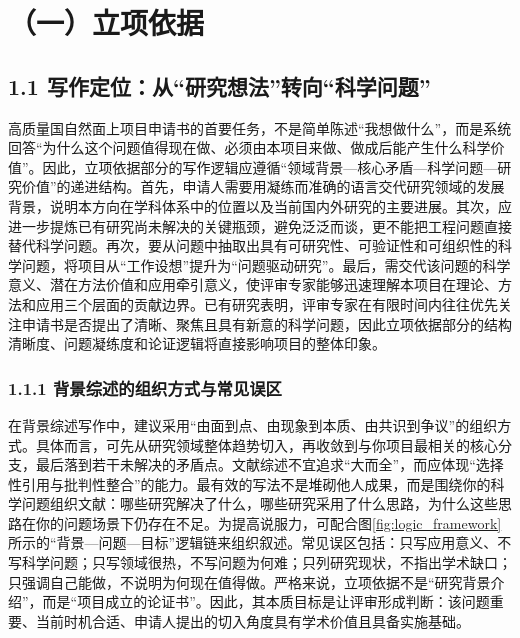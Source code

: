 \documentclass[12pt,UTF8,AutoFakeBold=2,a4paper]{ctexart}
\begin{document}
	\NSFCReportTitle
	\NSFCIntro

	\section{（一）立项依据}
	\NSFCGuideText{\NSFCSectionOneGuide}
	
	\subsection{1.1 写作定位：从“研究想法”转向“科学问题”}
	
	高质量国自然面上项目申请书的首要任务，不是简单陈述“我想做什么”，而是系统回答“为什么这个问题值得现在做、必须由本项目来做、做成后能产生什么科学价值”。因此，立项依据部分的写作逻辑应遵循“领域背景—核心矛盾—科学问题—研究价值”的递进结构。首先，申请人需要用凝练而准确的语言交代研究领域的发展背景，说明本方向在学科体系中的位置以及当前国内外研究的主要进展。其次，应进一步提炼已有研究尚未解决的关键瓶颈，避免泛泛而谈，更不能把工程问题直接替代科学问题。再次，要从问题中抽取出具有可研究性、可验证性和可组织性的科学问题，将项目从“工作设想”提升为“问题驱动研究”。最后，需交代该问题的科学意义、潜在方法价值和应用牵引意义，使评审专家能够迅速理解本项目在理论、方法和应用三个层面的贡献边界。已有研究表明，评审专家在有限时间内往往优先关注申请书是否提出了清晰、聚焦且具有新意的科学问题，因此立项依据部分的结构清晰度、问题凝练度和论证逻辑将直接影响项目的整体印象\cite{Herbert2013,Barnett2015,Fang2016}。
	
	\subsubsection{1.1.1 背景综述的组织方式与常见误区}
	
	在背景综述写作中，建议采用“由面到点、由现象到本质、由共识到争议”的组织方式。具体而言，可先从研究领域整体趋势切入，再收敛到与你项目最相关的核心分支，最后落到若干未解决的矛盾点。文献综述不宜追求“大而全”，而应体现“选择性引用与批判性整合”的能力。最有效的写法不是堆砌他人成果，而是围绕你的科学问题组织文献：哪些研究解决了什么，哪些研究采用了什么思路，为什么这些思路在你的问题场景下仍存在不足。为提高说服力，可配合图\ref{fig:logic_framework}所示的“背景—问题—目标”逻辑链来组织叙述。常见误区包括：只写应用意义、不写科学问题；只写领域很热，不写问题为何难；只列研究现状，不指出学术缺口；只强调自己能做，不说明为何现在值得做。严格来说，立项依据不是“研究背景介绍”，而是“项目成立的论证书”。因此，其本质目标是让评审形成判断：该问题重要、当前时机合适、申请人提出的切入角度具有学术价值且具备实施基础\cite{Nicholas2019,Gallo2020}。
	
\end{document}
